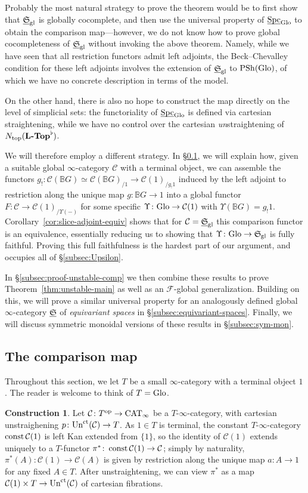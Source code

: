\documentclass[reqno]{memo-l}
\theoremstyle{mythm}
\theoremstyle{definition}
\newtheorem{constr}[thm]{Construction}
\numberwithin{equation}{section}
\newcommand{\Cc}{{\mathcal{C}}}
\newcommand{\Ff}{{\mathcal{F}}}
\newcommand{\gl}{\textup{gl}}
\DeclareMathOperator{\Spc}{Spc}
\DeclareMathOperator{\CAT}{CAT}
\DeclareMathOperator{\PSh}{PSh}
\newcommand{\Ntop}{{N_\textup{top}}}
\newcommand{\cat}[1]{\textbf{\textup{#1}}}
\newcommand{\op}{{\textup{op}}}
\newcommand{\const}{\textup{const}}
\newcommand{\ct}{\textup{ct}}
\newcommand{\Un}{\textup{Un}}
\newcommand{\dual}{\flat}
\newcommand{\Glo}{\textup{Glo}}
\newcommand{\BGcat}[1]{\mathbb B{#1}}
\newcommand{\ulhelper}[2]{\underline{\setbox0=\hbox{$#1#2$}\dp0=0.4pt \box0\relax}}
\newcommand{\ul}[1]{{\mathpalette\ulhelper{#1}}\hbox{\rule[-2pt]{0pt}{0pt}}}
\newcommand{\myS}{{{\mathfrak S\kern-.4pt}}}
\begin{document}
Probably the most natural strategy to prove the theorem would be to first show that $\ul\myS_\gl$ is globally cocomplete, and then use the universal property of $\ul\Spc_\Glo$ to obtain the comparison map---however, we do not know how to prove global cocompleteness of $\ul\myS_\gl$ without invoking the above theorem. Namely, while we have seen that all restriction functors admit left adjoints, the Beck--Chevalley condition for these left adjoints involves the extension of $\ul\myS_\gl$ to $\PSh(\Glo)$, of which we have no concrete description in terms of the model. 

On the other hand, there is also no hope to construct the map directly on the level of simplicial sets: the functoriality of $\ul\Spc_\Glo$ is defined via cartesian straightening, while we have no control over the cartesian \emph{un}straightening of $\Ntop(\cat{$\cat{L}$-Top}^\dual)$.

We will therefore employ a different strategy. In §\ref{subsec:comparison-map}, we will explain how, given a suitable global $\infty$-category $\Cc$ with a terminal object, we can assemble the functors $g_!\colon\Cc(\BGcat{G})\simeq\Cc(\BGcat{G})_{/1}\to\Cc(1)_{/g_!1}$ induced by the left adjoint to restriction along the unique map $g\colon\BGcat{G}\to 1$ into a global functor $F\colon\Cc\to\Cc(1)_{/\Upsilon(-)}$ for some specific $\Upsilon\colon\Glo\to\Cc(1)$ with $\Upsilon(\BGcat{G})= g_!1$. 
Corollary~\ref{cor:slice-adjoint-equiv} shows that for $\Cc=\ul\myS_\gl$ this comparison functor is an equivalence, essentially reducing us to showing that $\Upsilon\colon\Glo\to\myS_\gl$ is fully faithful. Proving this full faithfulness is the hardest part of our argument, and occupies all of §\ref{subsec:Upsilon}.

In §\ref{subsec:proof-unstable-comp} we then combine these results to prove Theorem~\ref{thm:unstable-main} as well as an   $\Ff$-global generalization. Building on this, we will prove a similar universal property for an analogously defined global $\infty$-category $\ul\myS$ of \emph{equivariant spaces} in §\ref{subsec:equivariant-spaces}. Finally, we will discuss symmetric monoidal versions of these results in §\ref{subsec:sym-mon}.

\subsection{The comparison map}\label{subsec:comparison-map} Throughout this section, we let $T$ be a small $\infty$-category with a terminal object $1$. The reader is welcome to think of $T=\Glo$.
\begin{constr}
    Let $\Cc\colon T^\op\to\CAT_\infty$ be a $T$-$\infty$-category, with cartesian unstraighening $p\colon\Un^\ct(\Cc)\to T$. As $1\in T$ is terminal, the constant $T$-$\infty$-category $\mathop\const\Cc(1)$ is left Kan extended from $\{1\}$, so the identity of $\Cc(1)$ extends uniquely to a $T$-functor ${\pi^*}\colon\mathop\const\Cc(1)\to\Cc$; simply by naturality, $\pi^*(A)\colon\Cc(1)\to\Cc(A)$ is given by restriction along the unique map $a\colon A\to 1$ for any fixed $A\in T$. After unstraightening, we can view $\pi^*$ as a map $\Cc(1)\times T\to\Un^\ct(\Cc)$ of cartesian fibrations.
\end{constr}
\end{document}
